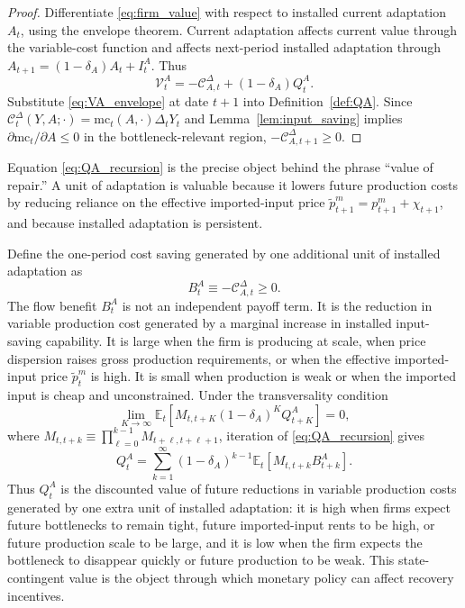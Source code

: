 ﻿\documentclass[12pt]{article}
\theoremstyle{remark}
\newcommand{\E}{\mathbb E}
\newcommand{\mc}{\mathrm{mc}}
\newcommand{\V}{\mathcal V}
\newcommand{\C}{\mathcal C}
\begin{document}
\begin{proof}
Differentiate \eqref{eq:firm_value} with respect to installed current adaptation $A_t$, using
the envelope theorem. Current adaptation affects current value through the variable-cost function
and affects next-period installed adaptation through
$A_{t+1}=(1-\delta_A)A_t+I_t^A$. Thus
\begin{equation}
    \V_t^A
    =
    -\C_{A,t}^\Delta+(1-\delta_A)Q_t^A.
    \label{eq:VA_envelope}
\end{equation}
Substitute \eqref{eq:VA_envelope} at date $t+1$ into Definition~\ref{def:QA}. Since
$\C_t^\Delta(Y,A;\cdot)=\mc_t(A,\cdot)\Delta_tY_t$ and Lemma~\ref{lem:input_saving} implies
$\partial\mc_t/\partial A\le 0$ in the bottleneck-relevant region, $-\C_{A,t+1}^\Delta\ge 0$.
\end{proof}

Equation \eqref{eq:QA_recursion} is the precise object behind the phrase ``value of repair.'' A
unit of adaptation is valuable because it lowers future production costs by reducing reliance on
the effective imported-input price $\tilde p_{t+1}^m=p_{t+1}^m+\chi_{t+1}$, and because installed
adaptation is persistent.

Define the one-period cost saving generated by one additional unit of installed adaptation as
\begin{equation}
    B_t^A
    \equiv
    -\C_{A,t}^\Delta
    \ge 0.
    \label{eq:adaptation_flow_benefit}
\end{equation}
The flow benefit $B_t^A$ is not an independent payoff term. It is the reduction in variable
production cost generated by a marginal increase in installed input-saving capability. It is large
when the firm is producing at scale, when price dispersion raises gross production requirements,
or when the effective imported-input price $\tilde p_t^m$ is high. It is small when production is
weak or when the imported input is cheap and unconstrained.
Under the transversality condition
\begin{equation}
    \lim_{K\to\infty}
    \E_t
    \left[
        M_{t,t+K}(1-\delta_A)^K Q_{t+K}^A
    \right]
    =
    0,
    \label{eq:adaptation_TVC}
\end{equation}
where $M_{t,t+k}\equiv\prod_{\ell=0}^{k-1}M_{t+\ell,t+\ell+1}$, iteration of
\eqref{eq:QA_recursion} gives
\begin{equation}
    Q_t^A
    =
    \sum_{k=1}^{\infty}
    (1-\delta_A)^{k-1}
    \E_t
    \left[
        M_{t,t+k}B_{t+k}^A
    \right].
    \label{eq:QA_forward}
\end{equation}
Thus $Q_t^A$ is the discounted value of future reductions in variable production costs generated
by one extra unit of installed adaptation: it is high when firms expect future bottlenecks to remain
tight, future imported-input rents to be high, or future production scale to be large, and it is low
when the firm expects the bottleneck to disappear quickly or future production to be weak. This
state-contingent value is the object through which monetary policy can affect recovery incentives.
\end{document}
